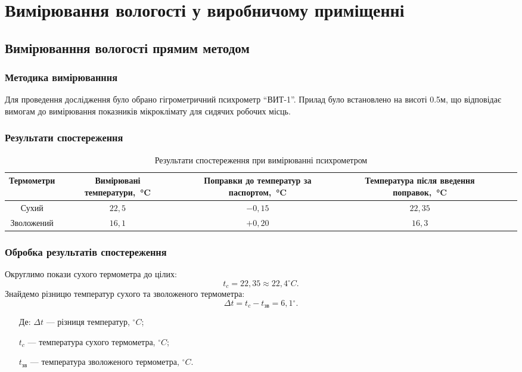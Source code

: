 \chapter{Вимірювання вологості у виробничому приміщенні}

\section{Вимірюванння вологості прямим методом}

\subsection{Методика вимірюванння}

Для проведення дослідження було обрано гігрометричний психрометр ``ВИТ-1''.  Прилад було
встановлено на висоті 0.5м, що відповідає вимогам до вимірювання показників мікроклімату для сидячих
робочих місць.

\subsection{Результати спостереження}

\begin{table}[ht]
  \centering
  \caption{Результати спостереження при вимірюванні психрометром}
\label{t:results_direct}
\begin{tabular}{| c | c | c | c | c | c |}
\hline
\multicolumn{1}{|C{3cm}|}{Термометри} &
\multicolumn{1}{C{3.5cm}|}{Вимірювані температури,~°C} &
\multicolumn{1}{C{3.5cm}|}{Поправки до температур за паспортом,~°C} &
\multicolumn{1}{C{5cm}|}{Температура після введення поправок,~°C} \\ \hline 
Сухий  & $22,5$ & $-0,15$ & $22,35$ \\ \hline 
Зволожений & $16,1$ & $+0,20$ & $16,3$ \\ \hline 
\end{tabular}
\end{table}

\subsection{Обробка результатів спостереження}

Округлимо покази сухого термометра до цілих: 
\begin{equation}
  t_c = 22,35 \approx 22,4{^\circ}C.
\end{equation}
Знайдемо різницю температур сухого та зволоженого термометра:
\begin{equation}
\Delta t = t_{c}-t_{\text{зв}} = 6,1{^\circ}.
\end{equation}
\begin{itemize}
\item [Де:] $\Delta t$ --- різниця температур, ${^\circ}C$;
\item []$t_{c}$ ---  температура сухого термометра, ${^\circ}C$;
\item []$t_{\text{зв}}$ --- температура зволоженого термометра, ${^\circ}C$.
\end{itemize}

